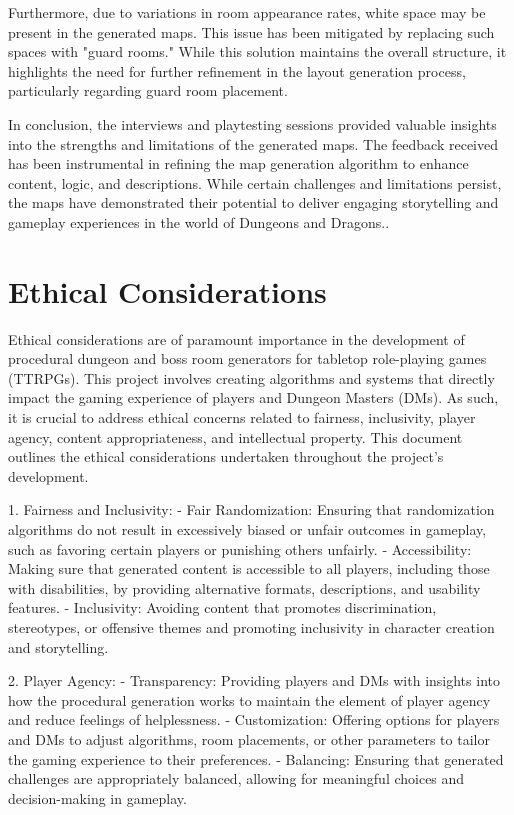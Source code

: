 \documentclass[10pt,twocolumn]{article}
\begin{document}
Furthermore, due to variations in room appearance rates, white space may be present in the generated maps. This issue has been mitigated by replacing such spaces with "guard rooms." While this solution maintains the overall structure, it highlights the need for further refinement in the layout generation process, particularly regarding guard room placement.

In conclusion, the interviews and playtesting sessions provided valuable insights into the strengths and limitations of the generated maps. The feedback received has been instrumental in refining the map generation algorithm to enhance content, logic, and descriptions. While certain challenges and limitations persist, the maps have demonstrated their potential to deliver engaging storytelling and gameplay experiences in the world of Dungeons and Dragons..

\section{Ethical Considerations}


Ethical considerations are of paramount importance in the development of procedural dungeon and boss room generators for tabletop role-playing games (TTRPGs). This project involves creating algorithms and systems that directly impact the gaming experience of players and Dungeon Masters (DMs). As such, it is crucial to address ethical concerns related to fairness, inclusivity, player agency, content appropriateness, and intellectual property. This document outlines the ethical considerations undertaken throughout the project's development.

1. Fairness and Inclusivity:
   - Fair Randomization: Ensuring that randomization algorithms do not result in excessively biased or unfair outcomes in gameplay, such as favoring certain players or punishing others unfairly.
   - Accessibility: Making sure that generated content is accessible to all players, including those with disabilities, by providing alternative formats, descriptions, and usability features.
   - Inclusivity: Avoiding content that promotes discrimination, stereotypes, or offensive themes and promoting inclusivity in character creation and storytelling.

2. Player Agency:
   - Transparency: Providing players and DMs with insights into how the procedural generation works to maintain the element of player agency and reduce feelings of helplessness.
   - Customization: Offering options for players and DMs to adjust algorithms, room placements, or other parameters to tailor the gaming experience to their preferences.
   - Balancing: Ensuring that generated challenges are appropriately balanced, allowing for meaningful choices and decision-making in gameplay.\cite{quinn2022ethics_rpg}
\end{document}
